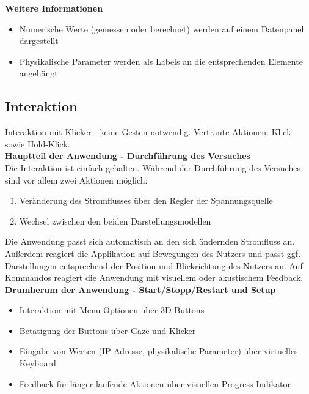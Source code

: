\textbf{Weitere Informationen}
\begin{itemize}[topsep=-2px]
	\setlength{\itemsep}{-5pt}
	\item Numerische Werte (gemessen oder berechnet) werden auf einem Datenpanel dargestellt
	\item Physikalische Parameter werden als Labels an die entsprechenden Elemente angehängt
\end{itemize}
\vspace{4px}

\subsection{Interaktion}
Interaktion mit Klicker - keine Gesten notwendig. Vertraute Aktionen: Klick sowie Hold-Klick.\\
\textbf{Hauptteil der Anwendung - Durchführung des Versuches}\\
Die Interaktion ist einfach gehalten. Während der Durchführung des Versuches sind vor allem zwei Aktionen möglich:
\begin{enumerate}[topsep=-2px]
	\setlength{\itemsep}{-5pt}
	\item Veränderung des Stromflusses über den Regler der Spannungsquelle
	\item Wechsel zwischen den beiden Darstellungsmodellen
\end{enumerate}
\vspace{4px}

Die Anwendung passt sich automatisch an den sich ändernden Stromfluss an. Außerdem reagiert die Applikation auf Bewegungen des Nutzers und passt ggf. Darstellungen entsprechend der Position und Blickrichtung des Nutzers an. Auf Kommandos reagiert die Anwendung mit visuellem oder akustischem Feedback.\\[4px]

\textbf{Drumherum der Anwendung - Start/Stopp/Restart und Setup}
\begin{itemize}[topsep=-2px]
	\setlength{\itemsep}{-5pt}
	\item Interaktion mit Menu-Optionen über 3D-Buttons
	\item Betätigung der Buttons über Gaze und Klicker
	\item Eingabe von Werten (IP-Adresse, physikalische Parameter) über virtuelles Keyboard
	\item Feedback für länger laufende Aktionen über visuellen Progress-Indikator
\end{itemize}


